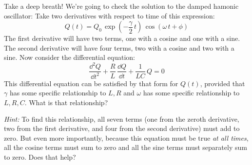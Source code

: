 \documentclass[12pt]{article}
\begin{document}
\startproblem%
Take a deep breath!
We're going to check the solution to the damped hamonic oscillator:
Take two derivatives with respect to time of this expression:
\begin{equation}
  Q(t) = Q_0\,\exp(-\frac{\gamma}{2}\,t)\,\cos(\omega\,t+\phi)
\end{equation}
The first derivative will have two terms, one with a cosine and one
with a sine. The second derivative will have four terms, two with a
cosine and two with a sine. Now consider the differential equation:
\begin{equation}
  \frac{\dd^2 Q}{\dd t^2} + \frac{R}{L}\,\frac{\dd Q}{\dd t} + \frac{1}{LC}\,Q = 0
\end{equation}
This differential equation can be satisfied by that form for $Q(t)$,
provided that $\gamma$ has some specific relationship to $L, R$ and
$\omega$ has some specific relationship to $L, R, C$. What is that
relationship?

\textsl{Hint:} To find this relationship, all seven terms (one from
the zeroth derivative, two from the first derivative, and four from
the second derivative) must add to zero. But even more importantly,
because this equation must be true \emph{at all times}, all the cosine
terms must sum to zero and all the sine terms must separately sum to
zero. Does that help?
\end{document}
